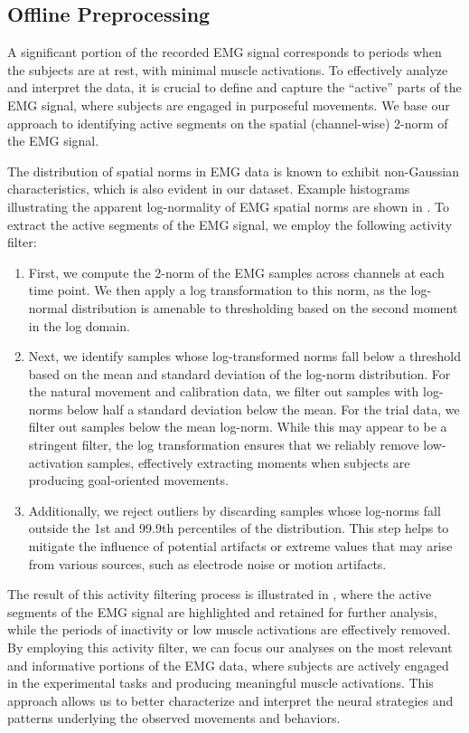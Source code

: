 \documentclass[../main.tex]{subfiles}
\begin{document}
\subsection{Offline Preprocessing}\label{subsection:offline_processing}

A significant portion of the recorded EMG signal corresponds to periods when the subjects are at rest, with minimal muscle activations. To effectively analyze and interpret the data, it is crucial to define and capture the ``active'' parts of the EMG signal, where subjects are engaged in purposeful movements. We base our approach to identifying active segments on the spatial (channel-wise) 2-norm of the EMG signal.

The distribution of spatial norms in EMG data is known to exhibit non-Gaussian characteristics, which is also evident in our dataset\cite{nazarpourNoteProbabilityDistribution2013a,sangerBayesianFilteringMyoelectric2007}. Example histograms illustrating the apparent log-normality of EMG spatial norms are shown in . To extract the active segments of the EMG signal, we employ the following activity filter:

\begin{enumerate}
  \item First, we compute the 2-norm of the EMG samples across channels at each time point. We then apply a log transformation to this norm, as the log-normal distribution is amenable to thresholding based on the second moment in the log domain. 
  \item Next, we identify samples whose log-transformed norms fall below a threshold based on the mean and standard deviation of the log-norm distribution. For the natural movement and calibration data, we filter out samples with log-norms below half a standard deviation below the mean. For the trial data, we filter out samples below the mean log-norm. While this may appear to be a stringent filter, the log transformation ensures that we reliably remove low-activation samples, effectively extracting moments when subjects are producing goal-oriented movements.
  \item Additionally, we reject outliers by discarding samples whose log-norms fall outside the 1st and 99.9th percentiles of the distribution. This step helps to mitigate the influence of potential artifacts or extreme values that may arise from various sources, such as electrode noise or motion artifacts.
\end{enumerate}

The result of this activity filtering process is illustrated in , where the active segments of the EMG signal are highlighted and retained for further analysis, while the periods of inactivity or low muscle activations are effectively removed. By employing this activity filter, we can focus our analyses on the most relevant and informative portions of the EMG data, where subjects are actively engaged in the experimental tasks and producing meaningful muscle activations. This approach allows us to better characterize and interpret the neural strategies and patterns underlying the observed movements and behaviors.
\end{document}
